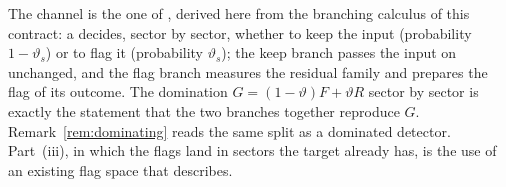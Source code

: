 
The channel is the one of \cite[Thm.~3, Eqs.~(20)--(24)]{nahar2025imperfect},
derived here from the branching calculus of this contract: a  decides, sector by sector, whether to keep the input
(probability $1-\vartheta_s$) or to flag it (probability $\vartheta_s$); the keep
branch passes the input on unchanged, and the flag branch measures the
residual family and prepares the flag of its outcome. The domination
$G=(1-\vartheta)F+\vartheta R$ sector by sector is exactly the statement that the
two branches together reproduce $G$. Remark~\ref{rem:dominating} reads the
same split as a dominated detector. Part~(iii), in which the flags land in
sectors the target already has, is the use of an existing flag space that
\cite[Technical aside~1]{nahar2025imperfect} describes.

